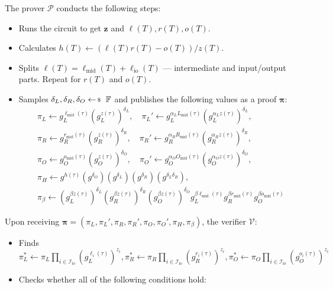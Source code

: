 \documentclass[../../book.tex]{subfiles}
\begin{document}
\begin{tcolorbox}
    The prover $\mathcal{P}$ conducts the following steps:
    \begin{itemize}[label=]
        \item Runs the circuit to get $\mathbf{z}$ and $\ell(T),r(T),o(T)$.
        \item Calculates $h(T) \gets (\ell(T)r(T) - o(T))\big/ z(T)$.
        \item Splits $\ell(T) = \ell_{\text{mid}}(T) + \ell_{\text{io}}(T)$ --- intermediate and input/output parts. Repeat for $r(T)$ and $o(T)$.
        \item Samples $\delta_L, \delta_R, \delta_O \leftarrowS \mathbb{F}$ and publishes the following values as a proof $\boldsymbol{\pi}$: 
        \begin{align*}
            \pi_L \gets g_L^{\ell_{\text{mid}}(\tau)}\left(g_L^{z(\tau)}\right)^{\delta_L}, \quad \pi_L' \gets g_L^{\alpha_LL_{\text{mid}}(\tau)}\left(g_L^{\alpha_L z(\tau)}\right)^{\delta_L}, \\
            \pi_R \gets g_R^{r_{\text{mid}}(\tau)}\left(g_R^{z(\tau)}\right)^{\delta_R}, \quad \pi_R' \gets g_R^{\alpha_RR_{\text{mid}}(\tau)}\left(g_R^{\alpha_R z(\tau)}\right)^{\delta_R}, \\
            \pi_O \gets g_O^{o_{\text{mid}}(\tau)}\left(g_O^{z(\tau)}\right)^{\delta_O}, \quad \pi_O' \gets g_O^{\alpha_OO_{\text{mid}}(\tau)}\left(g_O^{\alpha_O z(\tau)}\right)^{\delta_O}, \\
            \pi_H \gets g^{h(\tau)}(g^{\delta_O})(g^{\delta_L})(g^{\delta_R})(g^{\delta_L\delta_R}), \\ 
            \pi_{\beta} \gets \left(g_L^{\beta z(\tau)}\right)^{\delta_L}\left(g_R^{\beta z(\tau)}\right)^{\delta_R}\left(g_O^{\beta z(\tau)}\right)^{\delta_O}g_L^{\beta \ell_{\text{mid}}(\tau)}g_R^{\beta r_{\text{mid}}(\tau)}g_O^{\beta o_{\text{mid}}(\tau)}
        \end{align*}
    \end{itemize}

    Upon receiving $\boldsymbol{\pi} = (\pi_L,\pi_L',\pi_R,\pi_R',\pi_O,\pi_O',\pi_H,\pi_{\beta})$, the verifier $\mathcal{V}$:
    \begin{itemize}[label=]
        \item Finds $\pi_L^* \gets \pi_L\prod_{i \in \mathcal{I}_{\text{io}}} (g_L^{\ell_i(\tau)})^{z_i},\pi_R^* \gets \pi_R\prod_{i \in \mathcal{I}_{\text{io}}} (g_R^{r_i(\tau)})^{z_i},\pi_O^* \gets \pi_O\prod_{i \in \mathcal{I}_{\text{io}}} (g_O^{o_i(\tau)})^{z_i}$
        \item Checks whether all of the following conditions hold:
        

\end{itemize}
\end{tcolorbox}
\end{document}
